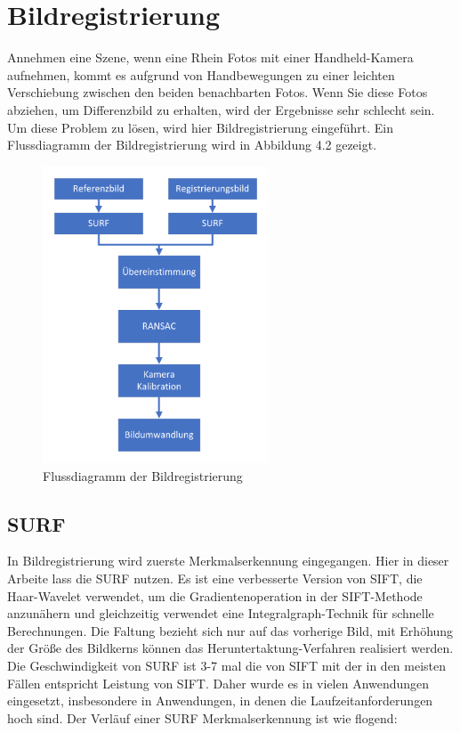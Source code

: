\section{Bildregistrierung} 

Annehmen eine Szene, wenn eine Rhein Fotos mit einer Handheld-Kamera aufnehmen, kommt es aufgrund von Handbewegungen zu einer leichten Verschiebung zwischen den beiden benachbarten Fotos. Wenn Sie diese Fotos abziehen, um Differenzbild zu erhalten, wird der Ergebnisse sehr schlecht sein. Um diese Problem zu lösen, wird hier Bildregistrierung eingeführt. Ein Flussdiagramm der Bildregistrierung wird in Abbildung 4.2 gezeigt. 

\begin{figure}[H]
 \centering 
 \includegraphics[keepaspectratio,width=0.6\textwidth]{images/4_ZweiteErfahrung/Bildregistration.pdf}
 \caption{Flussdiagramm der Bildregistrierung}
 \label{fig:Bildregistrierung}
\end{figure}

\subsection{SURF}
In Bildregistrierung wird zuerste Merkmalserkennung eingegangen. Hier in dieser Arbeite lass die SURF \cite{Surf} nutzen. Es ist eine verbesserte Version von SIFT, die Haar-Wavelet verwendet, um die Gradientenoperation in der SIFT-Methode anzunähern und gleichzeitig verwendet eine Integralgraph-Technik für schnelle Berechnungen. Die Faltung bezieht sich nur auf das vorherige Bild, mit Erhöhung der Größe des Bildkerns können das Heruntertaktung-Verfahren realisiert werden. Die Geschwindigkeit von SURF ist 3-7 mal die von SIFT mit der in den meisten Fällen entspricht   Leistung von SIFT. Daher wurde es in vielen Anwendungen eingesetzt, insbesondere in Anwendungen, in denen die Laufzeitanforderungen hoch sind. Der Verläuf einer SURF Merkmalserkennung ist wie flogend:

